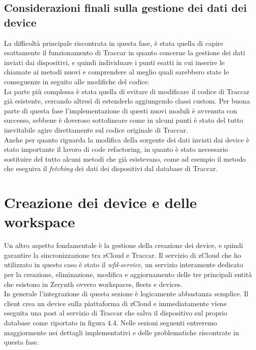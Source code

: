 \documentclass[a4paper,titlepage,12pt]{report}
\begin{document}
{\subsection{
Considerazioni finali sulla gestione dei dati dei device}
La difficoltà principale riscontrata in questa fase, è stata quella di capire esattamente il funzionamento di Traccar in quanto concerne la gestione dei dati inviati dai dispositivi, e quindi individuare i punti esatti in cui inserire le chiamate ai metodi nuovi e comprendere al meglio quali sarebbero state le conseguenze in seguito alle modifiche del codice.\\
 La parte più complessa è stata quella di evitare di modificare il codice di Traccar già esistente, cercando altresì di estenderlo aggiungendo classi custom. Per buona parte di questa fase l'implementazione di questi nuovi moduli è avvenuta con successo, sebbene è doveroso sottolineare come in alcuni punti è stato del tutto inevitabile agire direttamente sul codice originale di Traccar.\\
Anche per quanto riguarda la modifica della sorgente dei dati inviati dai device è stato importante il lavoro di code refactoring, in quanto è stato necessario sostituire del tutto alcuni metodi che già esistevano, come ad esempio il metodo che eseguiva il \textit{fetching} dei dati dei dispositivi dal database di Traccar.

\section{
Creazione dei device e delle workspace}
Un altro aspetto fondamentale è la gestione della creazione dei device, e quindi garantire la sincronizzazione tra zCloud e Traccar. Il servizio di zCloud che ho utilizzato in questo caso è stato il \textit{wfd-service}, un servizio interamente dedicato per la creazione, eliminazione, modifica e aggiornamento delle tre principali entità che esistono in Zerynth ovvero workspaces, fleets e devices. \\
In generale l'integrazione di questa sezione è logicamente abbastanza semplice. Il client crea un device sulla piattaforma di zCloud e immediatamente viene eseguita una post al servizio di Traccar che salva il dispositivo sul proprio database come riportato in figura 4.4. Nelle sezioni seguenti entreremo maggiormente nei dettagli implementativi e delle problematiche riscontrate in questa fase.


}
\end{document}
